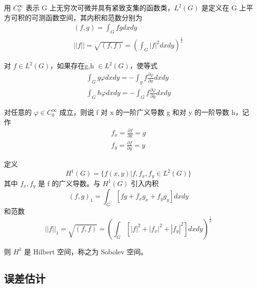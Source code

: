 \documentclass[a4paper,UTF8,titlepage]{ctexart}
\begin{document}
用 $C_0^{\infty} $ 表示 G 上无穷次可微并具有紧致支集的函数类，$L^2(G)$ 是定义在 G 上平方可积的可测函数空间，其内积和范数分别为
$$
\begin{matrix}
	(f,g) = \int_G fg dxdy \\ 
	||f || = \sqrt{(f,f)} = (\int_G |f|^2 dxdy)^{\frac{1}{2}}
\end{matrix}
$$

对 $f \in L^2(G)$，如果存在g,h $\in L^2(G)$，使等式
$$
\begin{matrix}
	\int_G g \varphi dxdy = - \int_g f \frac{\partial \varphi}{\partial x} dxdy \\
	\int_G h \varphi dxdy = - \int_G f \frac{\partial \varphi}{\partial y} dxdy
\end{matrix}
$$ 

对任意的 $\varphi \in C_0^{\infty}$ 成立，则说 f 对 x 的一阶广义导数 g 和对 y 的一阶导数 h，记作
$$
\begin{matrix}
	f_x = \frac{\partial f}{\partial x} = g \\
	f_y = \frac{\partial f}{\partial y} = y
\end{matrix}
$$

定义 
$$
	H^1(G) = \{f(x,y) | f, f_x, f_y \in L^2(G) \}
$$
其中 $f_x, f_y $ 是 f 的广义导数。与 $H^1(G)$ 引入内积
$$
	(f,g)_1 = \int_G [fg + f_x g_x + f_y g_y] dxdy
$$
和范数
$$
	||f||_1 = \sqrt{(f,f)} = (\int_G [|f|^2 + |f_x|^2 + |f_y|^2] dxdy )^{\frac{1}{2}}
$$

则 $H^1$ 是 Hilbert 空间，称之为 Sobolev 空间。
\subsection{误差估计}
\end{document}
